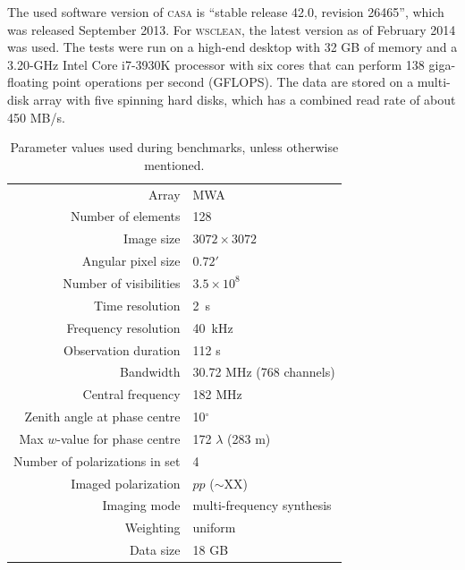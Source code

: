 \documentclass[useAMS,usenatbib]{mn2e}
\newcommand{\degree}{\ensuremath{^{\circ}}\xspace}
\begin{document}
The used software version of \textsc{casa} is ``stable release 42.0, revision 26465'', which was released September 2013. For \textsc{wsclean}, the latest version as of February 2014 was used. The tests were run on a high-end desktop with 32 GB of memory and a 3.20-GHz Intel Core i7-3930K processor with six cores that can perform 138 giga-floating point operations per second (GFLOPS). The data are stored on a multi-disk array with five spinning hard disks, which has a combined read rate of about 450 MB/s.
\begin{table}%
\caption{Parameter values used during benchmarks, unless otherwise mentioned.} \label{tbl:default-parameters}%
\begin{center}\begin{tabular}{rl}%
\hline
Array & MWA \\
Number of elements & 128 \\
Image size & $3072 \times 3072$ \\
Angular pixel size & $0.72'$ \\
Number of visibilities & $3.5 \times 10^8$ \\
Time resolution & 2~s \\
Frequency resolution & 40~kHz \\
Observation duration & 112 s\\
Bandwidth & 30.72 MHz (768 channels)\\
Central frequency & 182 MHz \\
Zenith angle at phase centre & 10\degree \\
Max $w$-value for phase centre & 172 $\lambda$ (283 m) \\
Number of polarizations in set & 4 \\
Imaged polarization & $pp$ ($\sim$XX) \\
Imaging mode & multi-frequency synthesis \\
Weighting & uniform \\
Data size & 18 GB \\
\hline
\end{tabular}\end{center}\end{table}
\end{document}
